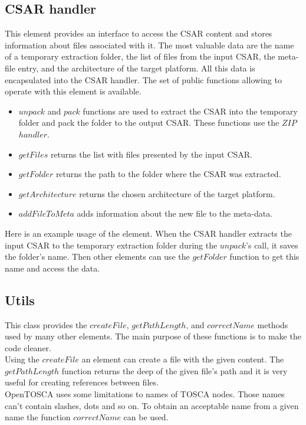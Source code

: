 \subsection*{CSAR handler}
This element provides an interface to access the CSAR content and stores information about files associated with it.
The most valuable data are the name of a temporary extraction folder, the list of files from the input CSAR, the meta-file entry, and the architecture of the target platform.
All this data is encapsulated into the CSAR handler.
The set of public functions allowing to operate with this element is available.
\begin{itemize}
	\item $unpack$ and $pack$ functions are used to extract the CSAR into the temporary folder and pack the folder to the output CSAR. 
	These functions use the $ZIP$~$handler$.
	\item $getFiles$ returns the list with files presented by the input CSAR.
	\item $getFolder$ returns the path to the folder where the CSAR was extracted.
	\item $getArchitecture$ returns the chosen architecture of the target platform.
	\item $addFileToMeta$ adds information about the new file to the meta-data.
\end{itemize}
Here is an example usage of the element.
When the CSAR handler extracts the input CSAR to the temporary extraction folder during the $unpack$'s call, it saves the folder's name. 
Then other elements can use the $getFolder$ function to get this name and access the data.

\subsection*{Utils}
This class provides the $createFile$, $getPathLength$, and $correctName$ methods used by many other elements.
The main purpose of these functions is to make the code cleaner. \\
Using the $createFile$ an element can create a file with the given content.
The $getPathLength$ function returns the deep of the given file's path and it is very useful for creating references between files.\\
OpenTOSCA uses some limitations to names of TOSCA nodes. 
Those names can't contain slashes, dots and so on.
To obtain an acceptable name from a given name the function $correctName$ can be used.

